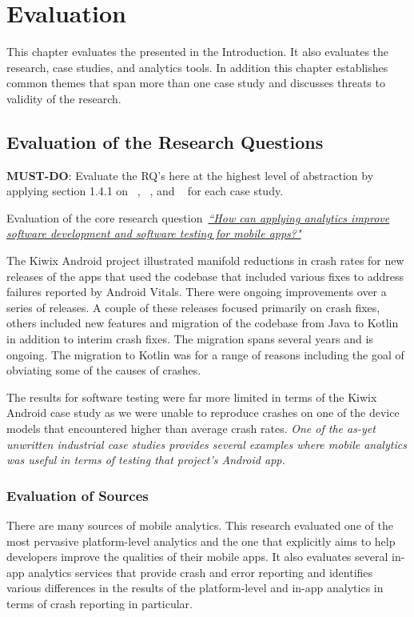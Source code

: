\setchapterpreamble[u]{\margintoc}
\chapter{Evaluation}
\label{chapter-evaluation}

This chapter evaluates the \href{section-research-questions}{} presented in the Introduction. It also evaluates the research, case studies, and analytics tools. In addition this chapter establishes common themes that span more than one case study and discusses threats to validity of the research. 


\section{Evaluation of the Research Questions}
\textbf{MUST-DO}: Evaluate the RQ's here at the highest level of abstraction by applying section 1.4.1 on ~\href{section-sources}{}, ~\href{section-value}{}, and ~\href{section-impact}{} for each case study.

Evaluation of the core research question~\href{core-research-question}{\emph{``How can applying analytics improve software development and software testing for mobile apps?"}}

The Kiwix Android project illustrated manifold reductions in crash rates for new releases of the apps that used the codebase that included various fixes to address failures reported by Android Vitals. There were ongoing improvements over a series of releases. A couple of these releases focused primarily on crash fixes, others included new features and migration of the codebase from Java to Kotlin in addition to interim crash fixes. 
The migration spans several years and is ongoing. The migration to Kotlin was for a range of reasons including the goal of obviating some of the causes of crashes.

The results for software testing were far more limited in terms of the Kiwix Android case study as we were unable to reproduce crashes on one of the device models that encountered higher than average crash rates. \emph{One of the as-yet unwritten industrial case studies provides several examples where mobile analytics was useful in terms of testing that project's Android app.}

\subsection{Evaluation of Sources}
There are many sources of mobile analytics. This research evaluated one of the most pervasive platform-level analytics and the one that explicitly aims to help developers improve the qualities of their mobile apps. It also evaluates several in-app analytics services that provide crash and error reporting and identifies various differences in the results of the platform-level and in-app analytics in terms of crash reporting in particular.

